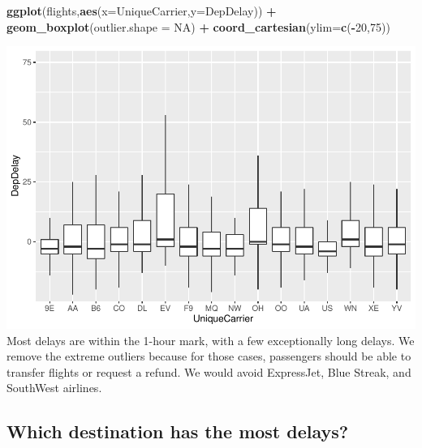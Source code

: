 \documentclass[]{article}
\newenvironment{Shaded}{\begin{snugshade}}{\end{snugshade}}
\newcommand{\DataTypeTok}[1]{\textcolor[rgb]{0.13,0.29,0.53}{#1}}
\newcommand{\DecValTok}[1]{\textcolor[rgb]{0.00,0.00,0.81}{#1}}
\newcommand{\KeywordTok}[1]{\textcolor[rgb]{0.13,0.29,0.53}{\textbf{#1}}}
\newcommand{\NormalTok}[1]{#1}
\newcommand{\OperatorTok}[1]{\textcolor[rgb]{0.81,0.36,0.00}{\textbf{#1}}}
\newcommand{\OtherTok}[1]{\textcolor[rgb]{0.56,0.35,0.01}{#1}}
\newcommand{\StringTok}[1]{\textcolor[rgb]{0.31,0.60,0.02}{#1}}
\begin{document}
\begin{Shaded}
\begin{Highlighting}[]
\KeywordTok{ggplot}\NormalTok{(flights,}\KeywordTok{aes}\NormalTok{(}\DataTypeTok{x=}\NormalTok{UniqueCarrier,}\DataTypeTok{y=}\NormalTok{DepDelay)) }\OperatorTok{+}\StringTok{ }\KeywordTok{geom_boxplot}\NormalTok{(}\DataTypeTok{outlier.shape =} \OtherTok{NA}\NormalTok{) }\OperatorTok{+}\StringTok{ }
\StringTok{   }\KeywordTok{coord_cartesian}\NormalTok{(}\DataTypeTok{ylim=}\KeywordTok{c}\NormalTok{(}\OperatorTok{-}\DecValTok{20}\NormalTok{,}\DecValTok{75}\NormalTok{))}
\end{Highlighting}
\end{Shaded}

\includegraphics{STA380_exercise_George_files/figure-latex/unnamed-chunk-9-2.pdf}
Most delays are within the 1-hour mark, with a few exceptionally long
delays. We remove the extreme outliers because for those cases,
passengers should be able to transfer flights or request a refund. We
would avoid ExpressJet, Blue Streak, and SouthWest airlines.

\hypertarget{which-destination-has-the-most-delays}{%
\subsection{Which destination has the most
delays?}\label{which-destination-has-the-most-delays}}
\end{document}
